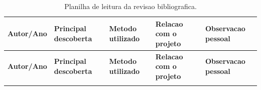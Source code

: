 \documentclass[12pt,oneside,a4paper,english,brazilian]{abntex2}
\begin{document}
\small
\setlength{\tabcolsep}{3pt}
\begin{longtable}{@{}>{\RaggedRight\arraybackslash}p{}>{\RaggedRight\arraybackslash}p{}>{\RaggedRight\arraybackslash}p{}>{\RaggedRight\arraybackslash}p{}>{\RaggedRight\arraybackslash}p{}@{}}
\caption{Planilha de leitura da revisao bibliografica.}\label{tab:rev-biblio}\\
\toprule
\textbf{Autor/Ano} & \textbf{Principal descoberta} & \textbf{Metodo utilizado} & \textbf{Relacao com o projeto} & \textbf{Observacao pessoal} \\
\midrule
\endfirsthead

\toprule
\textbf{Autor/Ano} & \textbf{Principal descoberta} & \textbf{Metodo utilizado} & \textbf{Relacao com o projeto} & \textbf{Observacao pessoal} \\
\midrule
\endhead

\midrule
\endfoot

\bottomrule
\endlastfoot


\end{longtable}
\end{document}
